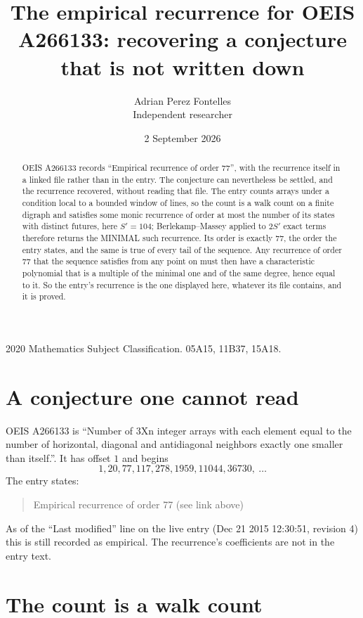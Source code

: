 \documentclass[11pt,a4paper]{article}
\title{The empirical recurrence for OEIS A266133: recovering a conjecture that is not written down}
\author{Adrian Perez Fontelles\\ \small Independent researcher}
\date{2 September 2026}
\theoremstyle{plain}
\theoremstyle{definition}
\begin{document}
\maketitle

\begin{abstract}
OEIS A266133 records ``Empirical recurrence of order $77$'', with the recurrence itself in a
linked file rather than in the entry. The conjecture can nevertheless be settled, and the
recurrence recovered, without reading that file. The entry counts arrays under a condition
local to a bounded window of lines, so the count is a walk count on a finite digraph and
satisfies some monic recurrence of order at most the number of its states with distinct
futures, here $S'=104$; Berlekamp--Massey applied to $2S'$ exact
terms therefore returns the MINIMAL such recurrence. Its order is exactly $77$, the order
the entry states, and the same is true of every tail of the sequence. Any recurrence of order
$77$ that the sequence satisfies from any point on must then have a characteristic
polynomial that is a multiple of the minimal one and of the same degree, hence equal to it. So
the entry's recurrence is the one displayed here, whatever its file contains, and it is
proved.
\end{abstract}

\noindent\small 2020 Mathematics Subject Classification. 05A15, 11B37, 15A18.\normalsize

\section{A conjecture one cannot read}

OEIS A266133 is ``Number of 3Xn integer arrays with each element equal to the number of horizontal, diagonal and antidiagonal neighbors exactly one smaller than itself.''. It has offset $1$ and begins
\[
1, 20, 77, 117, 278, 1959, 11044, 36730,\ \dots
\]
The entry states:
\begin{quote}
Empirical recurrence of order 77 (see link above)
\end{quote}
As of the ``Last modified'' line on the live entry (Dec 21 2015 12:30:51, revision 4) this is still
recorded as empirical. The recurrence's coefficients are not in the entry text.

\section{The count is a walk count}
\end{document}

